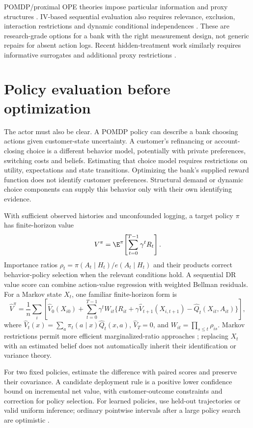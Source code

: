 POMDP/proximal OPE theories impose particular information and proxy
structures \citep{tennenholtz2020,bennett2021,bennettprox2023}.
IV-based sequential evaluation also requires relevance, exclusion,
interaction restrictions and dynamic conditional independences
\citep{xu2023}. These are research-grade options for a bank with the
right measurement design, not generic repairs for absent action logs.
Recent hidden-treatment work similarly requires informative surrogates
and additional proxy restrictions \citep{hidden2026}.

\section{Policy evaluation before optimization}
The actor must also be clear. A POMDP policy can describe a bank choosing
actions given customer-state uncertainty. A customer's refinancing or
account-closing choice is a different behavior model, potentially with
private preferences, switching costs and beliefs. Estimating that choice
model requires restrictions on utility, expectations and state transitions.
Optimizing the bank's supplied reward function does not identify customer
preferences. Structural demand or dynamic choice components can supply
this behavior only with their own identifying evidence.

With sufficient observed histories and unconfounded logging, a target
policy $\pi$ has finite-horizon value
\[
 V^\pi=\E^\pi\!\left[\sum_{t=0}^{T-1}\gamma^tR_t\right].
\]
Importance ratios $\rho_t=\pi(A_t\mid H_t)/e(A_t\mid H_t)$
and their products correct behavior-policy selection when the relevant
conditions hold. A sequential DR value score can combine action-value
regression with weighted Bellman residuals. For a Markov state $X_t$,
one familiar finite-horizon form is
\begin{equation}
 \widehat V^\pi=
 \frac1n\sum_i\left[
 \widehat V_0(X_{i0})+
 \sum_{t=0}^{T-1}\gamma^tW_{it}
 \{R_{it}+\gamma\widehat V_{t+1}(X_{i,t+1})
                   -\widehat Q_t(X_{it},A_{it})\}\right],
 \label{eq:opedr}
\end{equation}
where $\widehat V_t(x)=\sum_a\pi_t(a\mid x)\widehat Q_t(x,a)$,
$\widehat V_T=0$, and $W_{it}=\prod_{s\leq t}\rho_{is}$.
Markov restrictions permit more efficient marginalized-ratio approaches
\citep{kallus2020}; replacing $X_t$ with an estimated belief does not
automatically inherit their identification or variance theory.

For two fixed policies, estimate the difference with paired scores and
preserve their covariance. A candidate deployment rule is a positive
lower confidence bound on incremental net value, with customer-outcome
constraints and correction for policy selection. For learned policies,
use held-out trajectories or valid uniform inference; ordinary pointwise
intervals after a large policy search are optimistic
\citep{policy2021}.

